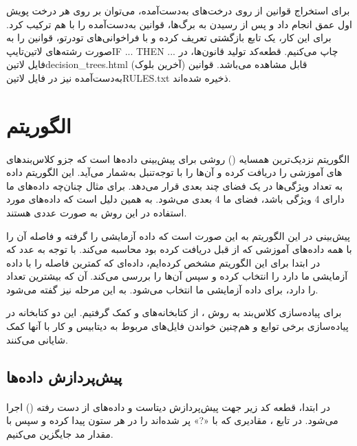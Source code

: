 \documentclass[a4paper,12pt]{article}
\begin{document}
	
	برای استخراج قوانین از روی درخت‌های به‌دست‌آمده، می‌توان بر روی هر درخت پویش اول عمق انجام داد و پس از رسیدن به برگ‌ها، قوانین به‌دست‌آمده را با هم ترکیب کرد. برای این کار، یک تابع بازگشتی تعریف کرده و با فراخوانی‌های تودرتو، قوانین را به صورت رشته‌های ‌لاتین{‌تایپ{IF ... THEN ...}} چاپ می‌کنیم. قطعه‌کد تولید قانون‌ها، در فایل ‌لاتین{decision\_trees.html} (آخرین بلوک) قابل مشاهده می‌باشد. قوانین به‌دست‌آمده نیز در فایل ‌لاتین{RULES.txt} ذخیره شده‌اند.
	
\section{الگوریتم }
\paragraph{}
الگوریتم  نزدیک‌ترین همسایه () روشی برای پیش‌بینی  داده‌ها است که جزو کلاس‌بندهای تنبل به‌شمار می‌آید. این الگوریتم داده‌‎های آموزشی را دریافت کرده و آن‌ها را با توجه به تعداد ویژگی‌ها در یک فضای چند بعدی قرار می‌دهد. برای مثال چنان‌چه داد‌ه‌های ما دارای 4 ویژگی باشد، فضای ما 4 بعدی می‌شود. به همین دلیل است که داده‌های مورد استفاده در این روش به صورت عددی هستند.

پیش‌بینی در این الگوریتم به این صورت است که داده آزمایشی را گرفته و فاصله آن را با همه داده‌های آموزشی که از قبل دریافت کرده بود محاسبه می‌کند. با توجه به عدد  که در ابتدا برای این الگوریتم مشخص کرده‌ایم،  داده‌ای که کمترین فاصله را با داده آزمایشی ما دارد را انتخاب کرده و سپس  آن‌ها را بررسی می‌کند. آن  که بیشترین تعداد را دارد، برای  داده آزمایشی ما انتخاب می‌شود. به این مرحله  نیز گفته می‌شود.

برای پیاده‌سازی کلاس‌بند به روش ، از کتابخانه‌های  و  کمک گرفتیم. این دو کتابخانه در پیاده‌سازی برخی توابع و هم‌چنین خواندن فایل‌های مربوط به دیتابیس و کار با آنها کمک شایانی می‌کنند.

\subsection{پیش‌پردازش داده‌ها}
\paragraph{}
در ابتدا، قطعه کد زیر جهت پیش‌پردازش دیتاست و داده‌های از دست رفته
 () اجرا می‌شود.
  در تابع ، مقادیری که با «?» پر شده‌اند را در هر ستون پیدا کرده و سپس با مقدار مد جایگزین می‌کنیم.
\end{document}

